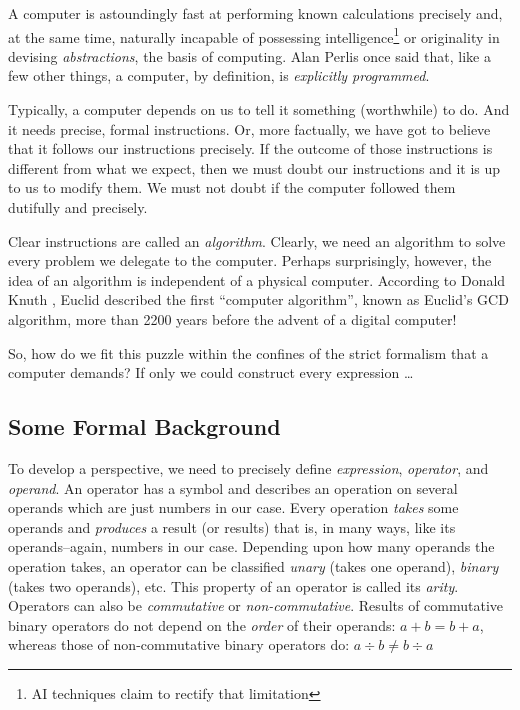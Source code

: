 \documentclass[english,smartquotes]{hgbarticle}
\begin{document}
A computer is astoundingly fast at performing known calculations precisely and, at the same time, naturally incapable of possessing intelligence\footnote{AI techniques claim to rectify that limitation} or originality in devising \textit{abstractions}, the basis of computing. Alan Perlis once said \cite{Perlis1984} that, like a few other things, a computer, by definition, is \textit{explicitly programmed}. 

Typically, a computer depends on us to tell it something (worthwhile) to do. And it needs precise, formal instructions. Or, more factually, we have got to believe that it follows our instructions precisely. If the outcome of those instructions is different from what we expect, then we must doubt our instructions and it is up to us to modify them. We must not doubt if the computer followed them dutifully and precisely. 

Clear instructions are called an \emph{algorithm}. Clearly, we need an algorithm to solve every problem we delegate to the computer. Perhaps surprisingly, however, the idea of an algorithm is independent of a physical computer. According to Donald Knuth \cite{Knuth1997}, Euclid described the first ``computer algorithm'', known as Euclid's GCD algorithm, more than 2200 years before the advent of a digital computer!

So, how do we fit this puzzle within the confines of the strict formalism that a computer demands? If only we could construct every expression \dots

\subsection{Some Formal Background}
To develop a perspective, we need to precisely define \textit{expression}, \textit{operator}, and \textit{operand}. An operator has a symbol and describes an operation on several operands which are just numbers in our case. Every operation \textit{takes} some operands and \textit{produces} a result (or results) that is, in many ways, like its operands--again, numbers in our case. Depending upon how many operands the operation takes, an operator can be classified \textit{unary} (takes one operand), \textit{binary} (takes two operands), etc. This property of an operator is called its \textit{arity}. Operators can also be \emph{commutative} or \emph{non-commutative}. Results of commutative binary operators do not depend on the \emph{order} of their operands: $a+b=b+a$, whereas those of non-commutative binary operators do: $a\div b \ne b\div a$ 
\end{document}
